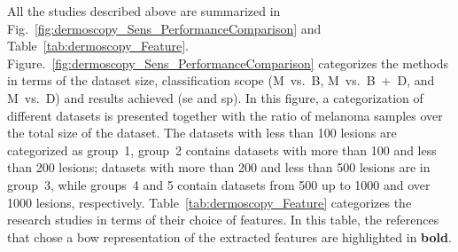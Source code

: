 All the studies described above are summarized in Fig.~\ref{fig:dermoscopy_Sens_PerformanceComparison} and Table~\ref{tab:dermoscopy_Feature}.
Figure.~\ref{fig:dermoscopy_Sens_PerformanceComparison} categorizes the methods in terms of the dataset size, classification scope (M~vs.~B, M~vs.~B~+~D, and M~vs.~D) and results achieved (\ac{se} and \ac{sp}).
In this figure, a categorization of different datasets is presented together with the ratio of melanoma samples over the total size of the dataset.
The datasets with less than 100 lesions are categorized as group~1, group~2 contains datasets with more than 100 and less than 200 lesions; datasets with more than 200 and less than 500 lesions are in group~3, while groups~4 and 5 contain datasets from 500 up to 1000 and over 1000 lesions, respectively.
Table~\ref{tab:dermoscopy_Feature} categorizes the research studies in terms of their choice of features.
In this table, the references that chose a \ac{bow} representation of the extracted features are highlighted in \textbf{bold}.


